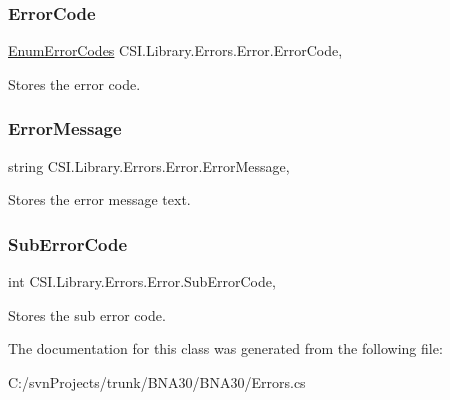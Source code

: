 \subsubsection{\texorpdfstring{ErrorCode}{ErrorCode}}
{\footnotesize\ttfamily \mbox{\hyperlink{namespace_c_s_i_1_1_library_1_1_errors_a5534735de1ef2256eb4c52c7440e30d7}{Enum\+Error\+Codes}} C\+S\+I.\+Library.\+Errors.\+Error.\+Error\+Code\hspace{0.3cm}{\ttfamily [get]}, {\ttfamily [set]}}



Stores the error code. 

\mbox{\label{class_c_s_i_1_1_library_1_1_errors_1_1_error_a83f01ebbb48d1cb6412cd42a011b0889}} 
\subsubsection{\texorpdfstring{ErrorMessage}{ErrorMessage}}
{\footnotesize\ttfamily string C\+S\+I.\+Library.\+Errors.\+Error.\+Error\+Message\hspace{0.3cm}{\ttfamily [get]}, {\ttfamily [set]}}



Stores the error message text. 

\mbox{\label{class_c_s_i_1_1_library_1_1_errors_1_1_error_ad0e36824c48ef4ad7bcfb0b90c24263d}} 
\subsubsection{\texorpdfstring{SubErrorCode}{SubErrorCode}}
{\footnotesize\ttfamily int C\+S\+I.\+Library.\+Errors.\+Error.\+Sub\+Error\+Code\hspace{0.3cm}{\ttfamily [get]}, {\ttfamily [set]}}



Stores the sub error code. 



The documentation for this class was generated from the following file\+:\begin{DoxyCompactItemize}
\item 
C\+:/svn\+Projects/trunk/\+B\+N\+A30/\+B\+N\+A30/Errors.\+cs\end{DoxyCompactItemize}
